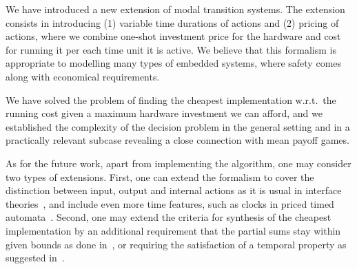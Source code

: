 We have introduced a new extension of modal transition systems. The 
extension consists in introducing (1) variable time durations of actions 
and (2) pricing of actions, where we combine one-shot investment price 
for the hardware and cost for running it per each time unit it is active. 
We believe that this formalism is appropriate to modelling many types of 
embedded systems, where safety comes along with economical requirements.

We have solved the problem of finding the cheapest implementation w.r.t.~the
running cost given a maximum hardware investment we can afford, and 
we established
the complexity of the decision problem in the general setting and 
in a practically relevant subcase revealing a close connection with
mean payoff games.

%


As for the future work, apart from implementing the algorithm, one may consider two types of extensions. First, one can extend the formalism to cover the distinction between input, output and internal actions as it is usual in interface theories~\cite{DBLP:conf/emsoft/ChakrabartiAHS03}, 
and include even more time features, such as clocks in priced timed automata~\cite{DBLP:conf/fmco/BehrmannLR04,DBLP:journals/fmsd/BouyerBL08}.
Second, one may extend the criteria for synthesis of the cheapest implementation by an additional requirement that the partial sums stay within given 
bounds as done in~\cite{DBLP:conf/formats/BouyerFLMS08}, 
or requiring the satisfaction of a temporal property as suggested 
in~\cite{DBLP:conf/emsoft/ChakrabartiAHS03,DBLP:conf/icalp/ChatterjeeD10}.

